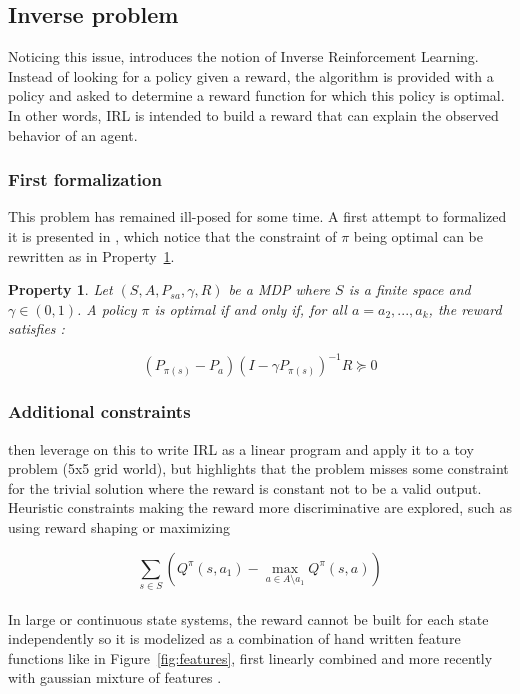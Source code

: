 \documentclass{article}
\newtheorem{property}{Property}
\begin{document}
\subsection{Inverse problem}

Noticing this issue, \cite{Russell98} introduces the notion of Inverse Reinforcement Learning. Instead of looking for a policy given a reward, the algorithm is provided with a policy and asked to determine a reward function for which this policy is optimal. In other words, IRL is intended to build a reward that can explain the observed behavior of an agent.

\subsubsection{First formalization}

This problem has remained ill-posed for some time. A first attempt to formalized it is presented in \cite{Ng00}, which notice that the constraint of $\pi$ being optimal can be rewritten as in Property~\ref{prop:irl}.

\begin{property}
\label{prop:irl}
Let  $(S,A,P_{sa},\gamma,R)$ be a MDP where $S$ is a finite space and $\gamma \in (0,1)$. A policy $\pi$ is optimal if and only if, for all $a=a_{2},...,a_{k}$, the reward satisfies :

\[
(P_{\pi(s)} - P_a)(I - \gamma P_{\pi(s)})^{-1} R \succeq 0
\]
\end{property}

\subsubsection{Additional constraints}

\cite{Ng00} then leverage on this to write IRL as a linear program and apply it to a toy problem (5x5 grid world), but highlights that the problem misses some constraint for the trivial solution where the reward is constant not to be a valid output. Heuristic constraints making the reward more discriminative are explored, such as using reward shaping \cite{Ng99} or maximizing

\[
\sum _{s \in S}\left(Q^\pi(s, a_1) - \max_{a \in A \setminus a_1} Q^\pi(s,a)\right)
\]

\paragraph{}
In large or continuous state systems, the reward cannot be built for each state independently so it is modelized as a combination of hand written feature functions like in Figure~\ref{fig:features}, first linearly combined \cite{Abbeel04} and more recently with gaussian mixture of features \cite{Levine11}.
\end{document}
